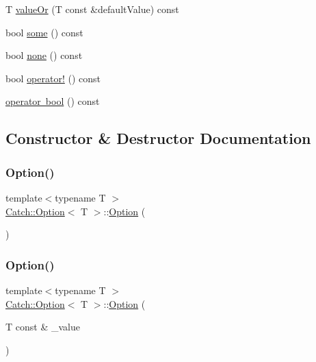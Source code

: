 \begin{DoxyCompactItemize}
\item 
T \mbox{\hyperlink{class_catch_1_1_option_a8d9ae2e30b0eb76fe134a6fbc8423124}{value\+Or}} (T const \&default\+Value) const
\item 
bool \mbox{\hyperlink{class_catch_1_1_option_a97c95829afbe92f2bcc5fd75b32c0825}{some}} () const
\item 
bool \mbox{\hyperlink{class_catch_1_1_option_a821753afdc3fac947a13a01fbe0d248e}{none}} () const
\item 
bool \mbox{\hyperlink{class_catch_1_1_option_a96dccb86bdf45ee0c08e122b6133bef3}{operator!}} () const
\item 
\mbox{\hyperlink{class_catch_1_1_option_aba0def0bd9cd45d4e00fe47a604b0270}{operator bool}} () const
\end{DoxyCompactItemize}


\subsection{Constructor \& Destructor Documentation}
\mbox{\label{class_catch_1_1_option_a8efb01b593d798decc80cbbdf311f2a3}} 
\subsubsection{\texorpdfstring{Option()}{Option()}\hspace{0.1cm}{\footnotesize\ttfamily [1/3]}}
{\footnotesize\ttfamily template$<$typename T $>$ \\
\mbox{\hyperlink{class_catch_1_1_option}{Catch\+::\+Option}}$<$ T $>$\+::\mbox{\hyperlink{class_catch_1_1_option}{Option}} (\begin{DoxyParamCaption}{ }\end{DoxyParamCaption})\hspace{0.3cm}{\ttfamily [inline]}}

\mbox{\label{class_catch_1_1_option_a5aeb9c22d48a6882bdf5fb4730b06c86}} 
\subsubsection{\texorpdfstring{Option()}{Option()}\hspace{0.1cm}{\footnotesize\ttfamily [2/3]}}
{\footnotesize\ttfamily template$<$typename T $>$ \\
\mbox{\hyperlink{class_catch_1_1_option}{Catch\+::\+Option}}$<$ T $>$\+::\mbox{\hyperlink{class_catch_1_1_option}{Option}} (\begin{DoxyParamCaption}\item[{T const \&}]{\+\_\+value }\end{DoxyParamCaption})\hspace{0.3cm}{\ttfamily [inline]}}

